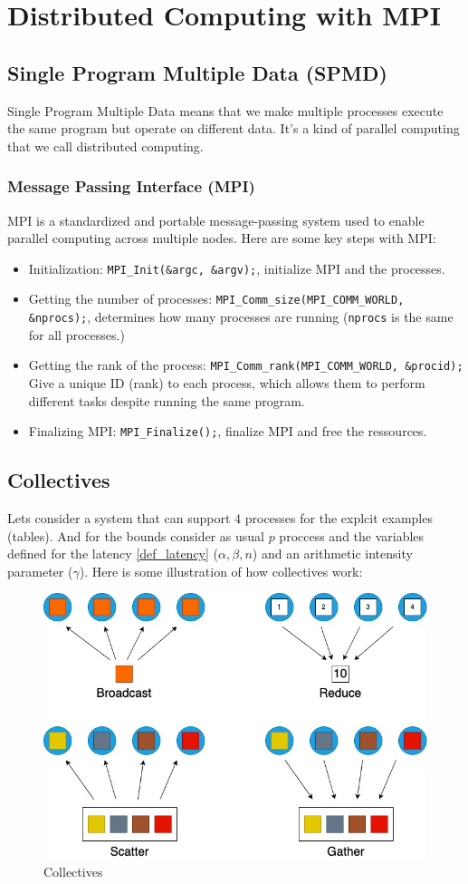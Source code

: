 \documentclass[12pt, openany]{report}
\theoremstyle{definition}
\newcommand{\code}[1]{\colorbox{light-gray}{\texttt{#1}}}
\begin{document}
\chapter{Distributed Computing with MPI}
\section{Single Program Multiple Data (SPMD)}
Single Program Multiple Data means that we make multiple processes execute the same program but operate on different data. It's a kind of parallel computing that we call distributed computing.
\subsection{Message Passing Interface (MPI)}
MPI is a standardized and portable message-passing system used to enable parallel computing across multiple nodes.
Here are some key steps with MPI:
\begin{itemize}
	\item Initialization: \code{MPI\_Init(\&argc, \&argv);}, initialize MPI and the processes.
	\item Getting the number of processes: \code{MPI\_Comm\_size(MPI\_COMM\_WORLD, \&nprocs);}, determines how many processes are running (\code{nprocs} is the same for all processes.)
	\item Getting the rank of the process: \code{MPI\_Comm\_rank(MPI\_COMM\_WORLD, \&procid);} Give a unique ID (rank) to each process, which allows them to perform different tasks despite running the same program.
	\item Finalizing MPI:  \code{MPI\_Finalize();}, finalize MPI and free the ressources.
\end{itemize}
\newpage
\section{Collectives}
Lets consider a system that can support $4$ processes for the explcit examples (tables). And for the bounds consider as usual $p$ proccess and the variables defined for the latency \ref{def_latency} ($\alpha,\beta,n$) and an arithmetic intensity parameter ($\gamma$). Here is some illustration of how collectives work:
\begin{figure}[H]
	\centering
	\includegraphics[scale=0.5]{img/collectives.jpeg}
	\caption{Collectives}
	\label{fig:collectives}
\end{figure}
\end{document}
